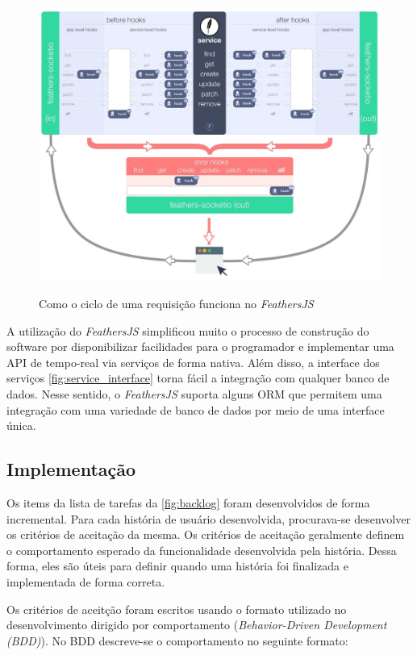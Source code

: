 \begin{figure}[!ht]
  \centering
  \caption{Como o ciclo de uma requisição funciona no \textit{FeathersJS}}
  \includegraphics[scale=0.45,valign=t]{imagens/feathers_request.jpeg}
  \fonte{}
  \label{fig:feathers_request}
\end{figure}

A utilização do \textit{FeathersJS} simplificou muito o processo de construção
do software por disponibilizar facilidades para o programador e implementar
uma API de tempo-real via serviços de forma nativa. Além disso, a interface dos
serviços \autoref{fig:service_interface} torna fácil a integração com qualquer banco de dados.
Nesse sentido, o \textit{FeathersJS} suporta alguns ORM que permitem uma integração
com uma variedade de banco de dados por meio de uma interface única.

\subsection{Implementação}\label{subsection:implementation}

Os items da lista de tarefas da \autoref{fig:backlog} foram desenvolvidos de forma incremental.
Para cada história de usuário desenvolvida, procurava-se desenvolver os critérios de aceitação da mesma.
Os critérios de aceitação geralmente definem o comportamento esperado da funcionalidade desenvolvida pela história.
Dessa forma, eles são úteis para definir quando uma história foi finalizada e implementada de forma correta.

Os critérios de aceitção foram escritos usando o formato utilizado no desenvolvimento dirigido por
comportamento (\textit{Behavior-Driven Development (BDD)}).
No BDD descreve-se o comportamento no seguinte formato:

